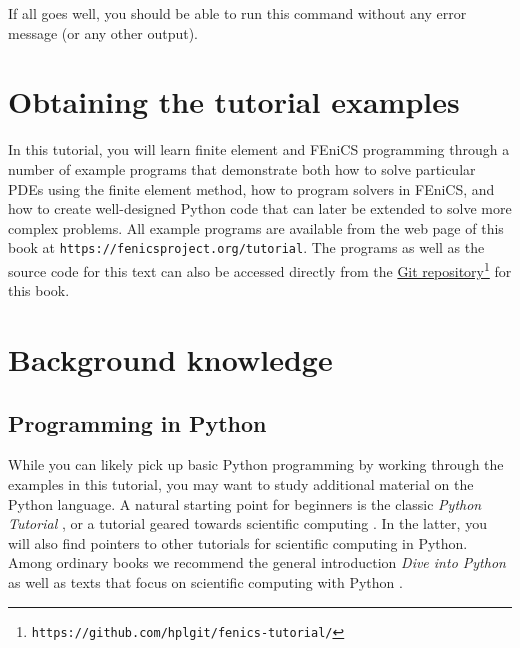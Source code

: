\documentclass[graybox,envcountchap,sectrefs,final]{svmonodo}
\begin{document}
If all goes well, you should be able to run this command without any
error message (or any other output).

\section{Obtaining the tutorial examples}

In this tutorial, you will learn finite element and FEniCS programming
through a number of example programs that demonstrate both how to
solve particular PDEs using the finite element method, how to program
solvers in FEniCS, and how to create well-designed Python code that
can later be extended to solve more complex problems. All
example programs are available from the web page of this book at
\texttt{https://fenicsproject.org/tutorial}. The programs as well as the
source code for this text can also be accessed directly from the \href{{https://github.com/hplgit/fenics-tutorial/}}{Git
repository}\footnote{\texttt{https://github.com/hplgit/fenics-tutorial/}} for this
book.


\section{Background knowledge}

\subsection{Programming in Python}
\label{ftut:pybooks}

While you can likely pick up basic Python programming by working
through the examples in this tutorial, you may want to study
additional material on the Python language. A natural starting point
for beginners is the classic \emph{Python Tutorial} \cite{PythonTutorial},
or a tutorial geared towards scientific computing
\cite{Langtangen_Hellevik_tutorial}.  In the latter, you will also find
pointers to other tutorials for scientific computing in Python. Among
ordinary books we recommend the general introduction \emph{Dive into
Python} \cite{Pilgrim} as well as texts that focus on scientific
computing with Python
\cite{Langtangen2008,Langtangen2009a,Kinder_Nelson_2015,Kiusalaas2005,Landau_2015}.

\end{document}
